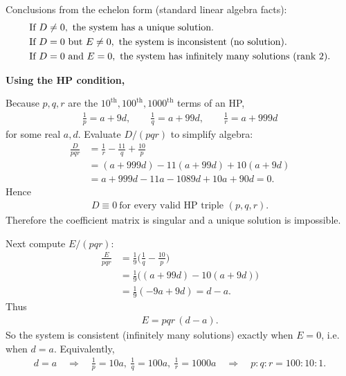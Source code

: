 \documentclass[12pt]{article}
\begin{document}
Conclusions from the echelon form (standard linear algebra facts):
\begin{align}
&\text{If } D\neq 0,\ \text{the system has a unique solution.} \notag \\
&\text{If } D=0 \text{ but } E\neq 0,\ \text{the system is inconsistent (no solution).} \notag \\
&\text{If } D=0 \text{ and } E=0,\ \text{the system has infinitely many solutions (rank 2).} \notag
\end{align}


\noindent\textbf{Using the HP condition,}

Because \(p,q,r\) are the \(10^{\text{th}},100^{\text{th}},1000^{\text{th}}\) terms of an HP,
\begin{align}
\frac{1}{p}=a+9d,\qquad \frac{1}{q}=a+99d,\qquad \frac{1}{r}=a+999d
\end{align}
for some real \(a,d\). Evaluate \(D/(pqr)\) to simplify algebra:
\begin{align}
\frac{D}{pqr}
&= \frac{1}{r} - \frac{11}{q} + \frac{10}{p}
\\
&= (a+999d) - 11(a+99d) + 10(a+9d)
\\
&= a + 999d -11a -1089d +10a +90d = 0.
\end{align}
Hence
\begin{align}
\boxed{D\equiv 0\ \text{for every valid HP triple }(p,q,r).}
\end{align}
Therefore the coefficient matrix is singular and a unique solution is impossible.

Next compute \(E/(pqr)\):
\begin{align}
\frac{E}{pqr}
&= \frac{1}{9}\Big(\frac{1}{q} - \frac{10}{p}\Big)
\\
&= \frac{1}{9}\big( (a+99d) - 10(a+9d)\big)
\\
&= \frac{1}{9}(-9a + 9d) = d-a.
\end{align}
Thus
\begin{align}
\boxed{E = pqr\,(d-a).}
\end{align}
So the system is consistent (infinitely many solutions) exactly when \(E=0\), i.e. when \(d=a\). Equivalently,
\begin{align}
d=a \quad\Longrightarrow\quad \frac{1}{p}=10a,\ \frac{1}{q}=100a,\ \frac{1}{r}=1000a
\quad\Longrightarrow\quad p:q:r = 100:10:1.
\end{align}
\end{document}
